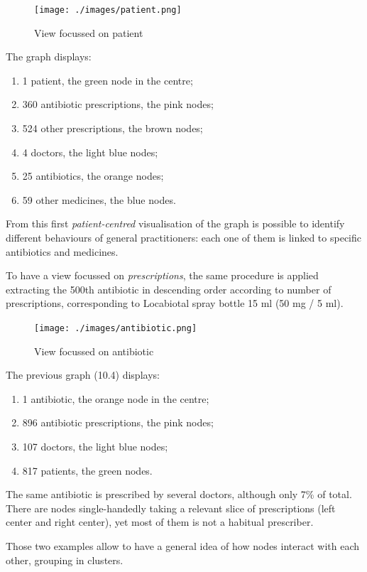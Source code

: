 \begin{figure}[h]
	\centering
	\texttt{[image: ./images/patient.png]}
	\caption{\small View focussed on patient}
\end{figure}

The graph displays:
\begin{enumerate}
	\item 1 patient, the green node in the centre;
	\item 360 antibiotic prescriptions, the pink nodes;
	\item 524 other prescriptions, the brown nodes;
	\item 4 doctors, the light blue nodes;
	\item 25 antibiotics, the orange nodes;
	\item 59 other medicines, the blue nodes. 
\end{enumerate}

From this first \textit{patient-centred} visualisation of the graph is possible to identify different behaviours of general practitioners: each one of them is linked to specific antibiotics and medicines.

To have a view focussed on \textit{prescriptions}, the same procedure is applied extracting the 500th antibiotic in descending order according to number of prescriptions, corresponding to Locabiotal spray bottle 15 ml (50 mg / 5 ml).

\begin{figure}[h]
	\centering
	\texttt{[image: ./images/antibiotic.png]}
	\caption{\small View focussed on antibiotic}
\end{figure}

The previous graph (10.4) displays:
\begin{enumerate}
	\item 1 antibiotic, the orange node in the centre;
	\item 896 antibiotic prescriptions, the pink nodes;
	\item 107 doctors, the light blue nodes;
	\item 817 patients, the green nodes.
\end{enumerate}

The same antibiotic is prescribed by several doctors, although only 7\% of total. There are nodes single-handedly taking a relevant slice of prescriptions (left center and right center), yet most of them is not a habitual prescriber.

Those two examples allow to have a general idea of how nodes interact with each other, grouping in clusters. 

